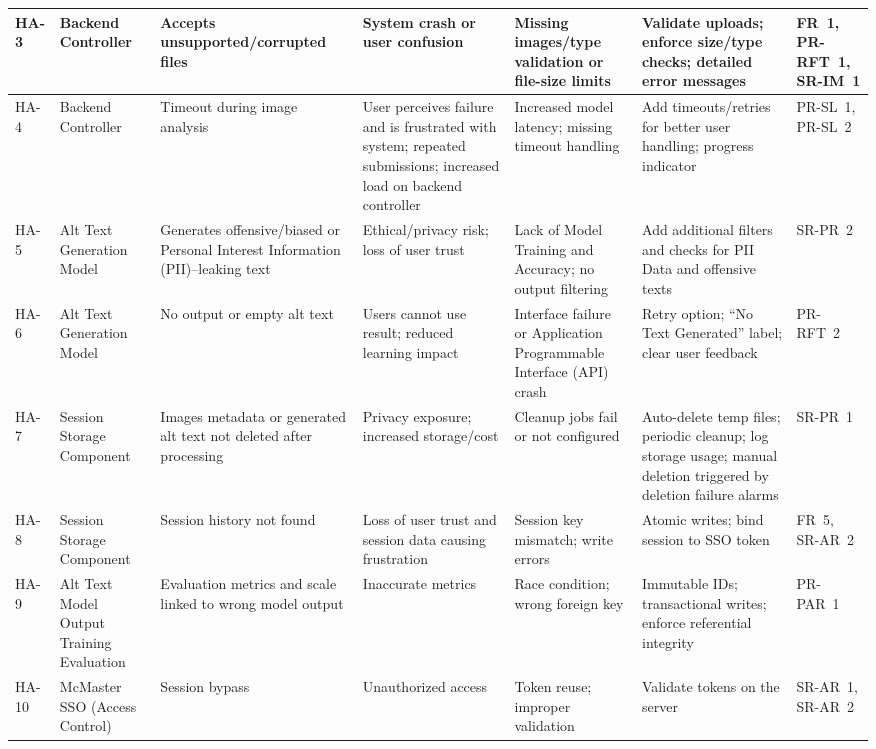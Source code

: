 \documentclass{article}
\begin{document}
\begin{landscape}
\begin{longtable}{|p{1.2cm}|p{2.0cm}|p{3.0cm}|p{3.2cm}|p{3.2cm}|p{4.0cm}|p{2.6cm}|}
    HA-3 & Backend Controller &
    Accepts unsupported/corrupted files &
    System crash or user confusion &
    Missing images/type validation or file-size limits &
    Validate uploads; enforce size/type checks; detailed error messages &
    FR~1, PR-RFT~1, SR-IM~1 \\ \hline
    
    HA-4 & Backend Controller &
    Timeout during image analysis &
    User perceives failure and is frustrated with system; repeated submissions; increased load on backend controller &
    Increased model latency; missing timeout handling &
    Add timeouts/retries for better user handling; progress indicator &
    PR-SL~1, PR-SL~2 \\ \hline
    
    HA-5 & Alt Text Generation Model &
    Generates offensive/biased or Personal Interest Information (PII)–leaking text &
    Ethical/privacy risk; loss of user trust &
    Lack of Model Training and Accuracy; no output filtering &
    Add additional filters and checks for PII Data and offensive texts &
    SR-PR~2 \\ \hline
    
    HA-6 & Alt Text Generation Model &
    No output or empty alt text &
    Users cannot use result; reduced learning impact &
    Interface failure or Application Programmable Interface (API) crash &
    Retry option; “No Text Generated” label; clear user feedback &
    PR-RFT~2 \\ \hline
    
    HA-7 & Session Storage Component &
    Images metadata or generated alt text not deleted after processing &
    Privacy exposure; increased storage/cost &
    Cleanup jobs fail or not configured &
    Auto-delete temp files; periodic cleanup; log storage usage; manual deletion triggered by deletion failure alarms &
    SR-PR~1 \\ \hline
    
    HA-8 & Session Storage Component &
    Session history not found &
    Loss of user trust and session data causing frustration &
    Session key mismatch; write errors &
    Atomic writes; bind session to SSO token &
    FR~5, SR-AR~2 \\ \hline
    
    HA-9 & Alt Text Model Output Training Evaluation &
    Evaluation metrics and scale linked to wrong model output &
    Inaccurate metrics &
    Race condition; wrong foreign key &
    Immutable IDs; transactional writes; enforce referential integrity &
    PR-PAR~1 \\ \hline
    
    HA-10 & McMaster SSO (Access Control) &
    Session bypass &
    Unauthorized access &
    Token reuse; improper validation &
    Validate tokens on the server &
    SR-AR~1, SR-AR~2 \\ \hline

    \end{longtable}
    
\end{landscape}
    
\end{document}

